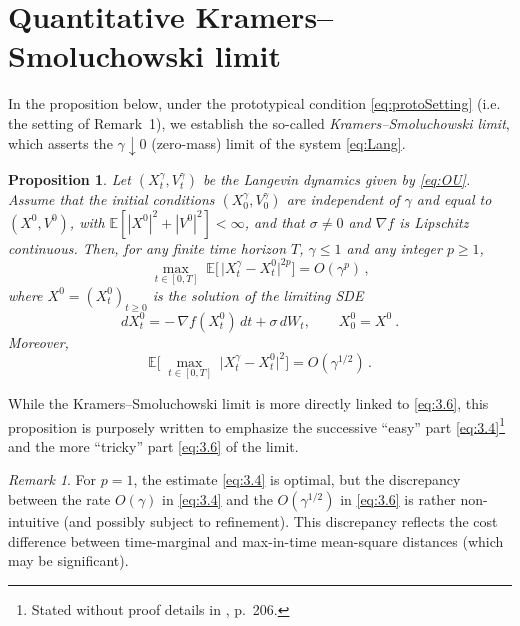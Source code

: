 \documentclass[12pt]{article}
\numberwithin{equation}{section}
\newtheorem{proposition}{Proposition}
\theoremstyle{remark}
\newtheorem{remark}{Remark}
\begin{document}
\section{Quantitative Kramers--Smoluchowski limit}

In the proposition below, under the prototypical condition \eqref{eq:protoSetting} (i.e. the setting of Remark 1), we establish the so-called \emph{Kramers--Smoluchowski limit}, which asserts the $\gamma \downarrow 0$ (zero-mass) limit of the system \eqref{eq:Lang}.

\begin{proposition}
Let $(X_t^\gamma, V_t^\gamma)$ be the Langevin dynamics given by \eqref{eq:OU}. Assume that the initial conditions $(X_0^\gamma, V_0^\gamma)$ are independent of $\gamma$ and equal to $(X^0, V^0)$, with $\mathbb{E}[|X^0|^2 + |V^0|^2] < \infty$, and that $\sigma \neq 0$ and $\nabla f$ is Lipschitz continuous. Then, for any finite time horizon $T$, $\gamma \le 1$ and any integer $p \ge 1$, 
\[ 
\max_{\,t \in [0,T]}\;\mathbb{E}\!\Big[\,\big|X_t^\gamma - X_t^0\big|^{2p}\Big] = O(\gamma^p)\,, 
\tag{3.4}
\] 
where $X^0 = (X_t^0)_{t\ge0}$ is the solution of the limiting SDE 
\[ 
dX_t^0 = -\,\nabla f(X_t^0)\,dt + \sigma\,dW_t, \qquad X_0^0 = X^0~. 
\tag{3.5}
\] 
Moreover, 
\[ 
\mathbb{E}\!\Big[\,\max_{\,t \in [0,T]}\;\big|X_t^\gamma - X_t^0\big|^2\Big] = O(\gamma^{1/2})\,. 
\tag{3.6}
\] 
\end{proposition}

While the Kramers--Smoluchowski limit is more directly linked to \eqref{eq:3.6}, this proposition is purposely written to emphasize the successive “easy” part \eqref{eq:3.4}\footnote{Stated without proof details in \cite{Pavliotis2014}, p. 206.} and the more “tricky” part \eqref{eq:3.6} of the limit. 

\begin{remark}
For $p = 1$, the estimate \eqref{eq:3.4} is optimal, but the discrepancy between the rate $O(\gamma)$ in \eqref{eq:3.4} and the $O(\gamma^{1/2})$ in \eqref{eq:3.6} is rather non-intuitive (and possibly subject to refinement). This discrepancy reflects the cost difference between time-marginal and max-in-time mean-square distances (which may be significant).
\end{remark}
\end{document}
